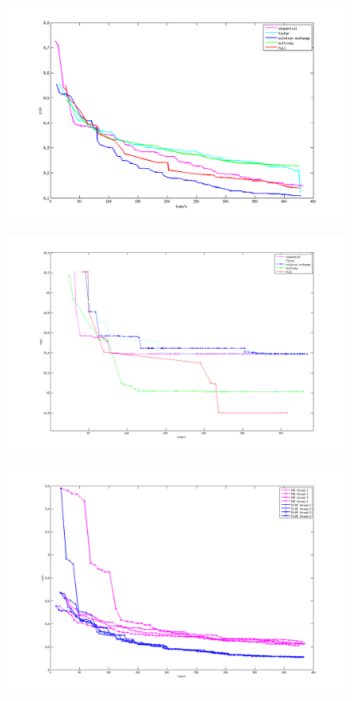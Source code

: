 \begin{figure}[tb]
  \includegraphics[width=\columnwidth]{figure/optical_flow_convergence.png}
  \caption{}\label{fig:optical_flow_convergence}
\end{figure}
\begin{figure}[tb]
 \includegraphics[width=\columnwidth]{figure/layered_depthmap_convergence.png}
 \caption{}\label{fig:layered_depthmap_convergence}
\end{figure}
\begin{figure}[tb]
  \includegraphics[width=\columnwidth]{figure/optical_flow_by_threads.png}
  \caption{}\label{fig:optical_flow_by_threads}
\end{figure}


